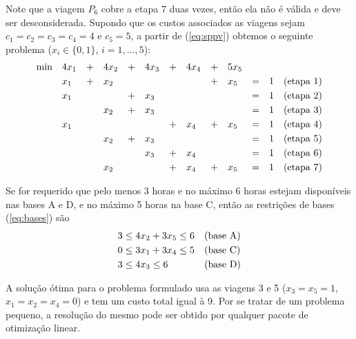 \documentclass[12pt,a4paper]{article}
\newcommand{\vsp}{\vspace{0.1cm}}                            %
\begin{document}
Note que a viagem $P_6$ cobre a etapa $7$ duas vezes, então ela não é válida e deve ser 
desconsiderada. Supondo que os custos associados as viagens sejam $c_1 = c_2 = c_3 = c_4 = 4$ e
$c_5 = 5$, a partir de (\ref{eq:sppv}) obtemos o seguinte problema ($x_i \in \{0, 1\}$, 
$i=1, \ldots, 5$):
%
\begin{equation*}
	\begin{array}{lllllllllllll}
		\text{min} & 4x_1 & + & 4x_2 & + & 4x_3 & + & 4x_4 & + & 5 x_5 & & & \vsp \\ 
		& x_1 & + & x_2 & & & & & + & x_5 & = & 1 & \text{(etapa 1)} \vsp \\
		& x_1 & & & + & x_3 & & & & & = & 1 & \text{(etapa 2)} \vsp \\
		& & & x_2 & + & x_3 & & & & & = & 1 & \text{(etapa 3)} \vsp \\
		& x_1 & & & & & + & x_4 & + & x_5 & = & 1 & \text{(etapa 4)} \vsp \\
		& & & x_2 & + & x_3 & & & & & = & 1 & \text{(etapa 5)} \vsp \\
		& & & & & x_3 & + & x_4 & & & = & 1 & \text{(etapa 6)} \vsp \\
		& & & x_2 & & & + & x_4 & + & x_5 & = & 1 & \text{(etapa 7)}
	\end{array}
\end{equation*}

Se for requerido que pelo menos 3 horas e no máximo 6 horas estejam 
disponíveis nas bases A e D, e no máximo 5 horas na base C, então as restrições de bases
(\ref{eq:bases}) são
%
\begin{equation*}
	\begin{array}{ll}
		3 \leq 4 x_2 + 3 x_5 \leq 6 & \text{(base A)} \vsp \\
		0 \leq 3 x_1 + 3 x_4 \leq 5 & \text{(base C)} \vsp \\
		3 \leq 4 x_3 \leq 6 & \text{(base D)}
	\end{array}
\end{equation*}

A solução ótima para o problema formulado usa as viagens 3 e 5 ($x_3 = x_5 = 1$, 
$x_1 = x_2 = x_4 =  0$) e tem um custo total igual à 9. Por se tratar de um problema pequeno, a
resolução do mesmo pode ser obtido por qualquer pacote de otimização linear.
\end{document}
